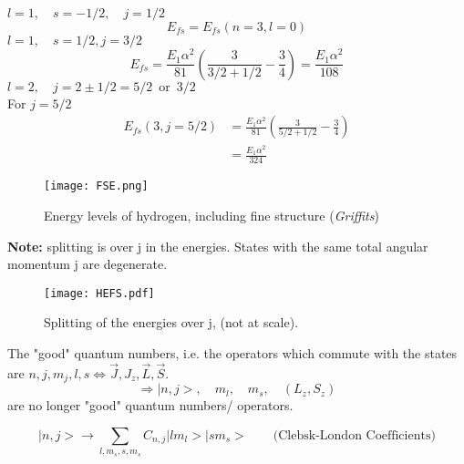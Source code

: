\documentclass[12pt,fancychapters]{report}
\numberwithin{equation}{section}
\begin{document}
$l=1, \quad s= -1/2, \quad j=1/2$
\[
  E_{fs} = E_{fs}(n=3, l=0)
\]
$l=1,\quad s = 1/2, j = 3/2$
\[
  E_{fs}= \frac{E_1\alpha^2}{81}\left(\frac{3}{3/2+1/2} -\frac{3}{4} \right) =
  \frac{E_1\alpha^2}{108}
\]
$l=2,\quad j=2\pm 1/2 = 5/2\,\,\,\text{or}\,\,\,3/2$\\
For $j=5/2$
\begin{align*}
  E_{fs}(3, j=5/2) &= \frac{E_1\alpha^2}{81}\left(\frac{3}{5/2+1/2}-\frac{3}{4}\right)\\
                   &= \frac{E_1\alpha^2}{324}
\end{align*}
\begin{figure}[H]
  \centering
  \texttt{[image: FSE.png]}
  \caption{Energy levels of hydrogen, including fine structure (\emph{Griffits})}
\end{figure}
\noindent
\textbf{Note:} splitting is over j in the energies. States with the same total angular momentum 
j are degenerate.
\begin{figure}[H]
  \centering
  \texttt{[image: HEFS.pdf]}
  \caption{Splitting of the energies over j, (not at scale).}
\end{figure}
\noindent
The "good" quantum numbers, i.e. the operators which commute with the states are 
$n, j, m_j, l,s \Longleftrightarrow  \vec{J},J_z, \vec{L}, \vec{S}$.
\[
\Rightarrow \big|n,j\big>, \quad m_l, \quad m_s , \quad (L_z, S_z)
\]
are no longer "good" quantum numbers/ operators.

\[
  \big|n,j\big> \longrightarrow \sum_{l,m_s,s,m_s} C_{n,j}\big|lm_l\big>\big|sm_s\big>\qquad
  \text{(Clebsk-London Coefficients)}
\]
\end{document}
